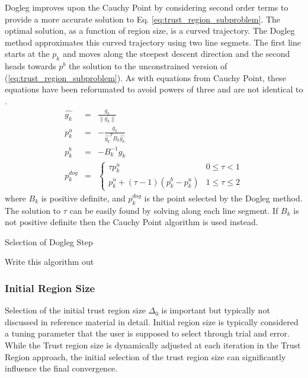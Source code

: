 \documentclass[peerreview,compsoc,onecolumn]{IEEEtran}
\newcommand{\norm}[1]{\left\lVert#1\right\rVert}
\begin{document}
Dogleg improves upon the Cauchy Point by considering second order terms to provide a more accurate solution to Eq. \ref{eq:trust_region_subproblem}. The optimal solution, as a function of region size, is a curved trajectory. The Dogleg method approximates this curved trajectory using two line segmets. The first line starts at the $p_k$ and moves along the steepest descent direction and the second heads towards $p^b$ the solution to the unconstrained version of (\ref{eq:trust_region_subproblem}). As with equations from Cauchy Point, these equations have been reforumated to avoid powers of three and are not identical to \cite{numopt2006,IMM2004}.
\begin{eqnarray}
\hat{g_k} &=& \frac{g_k}{\norm{g_k}} \\
p^u_k &=& -\frac{g_k}{\hat{g_k}^T B_k \hat{g_k}} \\
p^b_k &=& -B^{-1}_k g_k \\
p^{dog}_k &=&
\begin{cases}
	\tau p^u_k & 0 \le \tau < 1 \\
	p^u_k + (\tau -1)(p^b_k-p^u_k) & 1 \le \tau \le 2
\end{cases}
\end{eqnarray}
where $B_k$ is positive definite, and $p^{dog}_k$ is the point selected by the Dogleg method. The solution to $\tau$ can be easily found by solving along each line segment. If $B_k$ is not positive definite then the Cauchy Point algorithm is used instead.

\begin{algorithm}{}
\caption{\label{alg:dogleg_step}Selection of Dogleg Step}
\begin{algorithmic}[1]
	\State Write this algorithm out
\end{algorithmic}
\end{algorithm}

\subsubsection{Initial Region Size} 
\label{section:init_region_size}

Selection of the initial trust region size $\Delta_0$ is important but typically not discussed in reference material \cite{fletcher1987,numopt2006,IMM2004} in detail. Initial region size is typically considered a tuning parameter that the user is supposed to select through trial and error. While the Trust region size is dynamically adjusted at each iteration in the Trust Region approach, the initial selection of the trust region size can significantly influence the final convergence.
\end{document}
